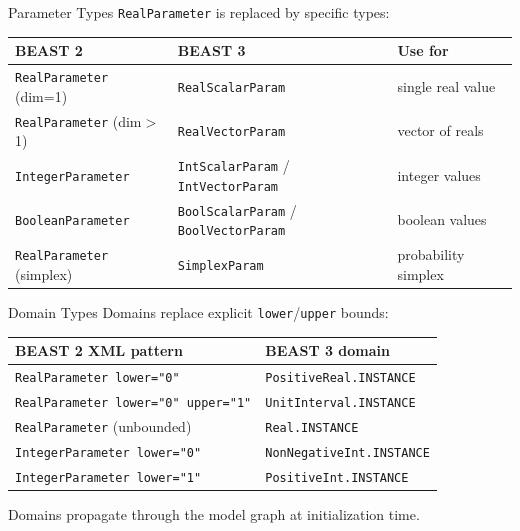 \documentclass[aspectratio=169,11pt]{beamer}
\newcommand{\code}[1]{\texttt{#1}}
\begin{document}
\begin{frame}{Parameter Types}
\code{RealParameter} is replaced by specific types:
\vspace{0.5em}

\begin{center}
\begin{tabular}{lll}
\toprule
\textbf{BEAST 2} & \textbf{BEAST 3} & \textbf{Use for} \\
\midrule
\code{RealParameter} (dim=1) & \code{RealScalarParam} & single real value \\
\code{RealParameter} (dim$>$1) & \code{RealVectorParam} & vector of reals \\
\code{IntegerParameter} & \code{IntScalarParam} / \code{IntVectorParam} & integer values \\
\code{BooleanParameter} & \code{BoolScalarParam} / \code{BoolVectorParam} & boolean values \\
\code{RealParameter} (simplex) & \code{SimplexParam} & probability simplex \\
\bottomrule
\end{tabular}
\end{center}
\end{frame}

\begin{frame}{Domain Types}
Domains replace explicit \code{lower}/\code{upper} bounds:
\vspace{0.5em}

\begin{center}
\begin{tabular}{ll}
\toprule
\textbf{BEAST 2 XML pattern} & \textbf{BEAST 3 domain} \\
\midrule
\code{RealParameter lower="0"} & \code{PositiveReal.INSTANCE} \\
\code{RealParameter lower="0" upper="1"} & \code{UnitInterval.INSTANCE} \\
\code{RealParameter} (unbounded) & \code{Real.INSTANCE} \\
\code{IntegerParameter lower="0"} & \code{NonNegativeInt.INSTANCE} \\
\code{IntegerParameter lower="1"} & \code{PositiveInt.INSTANCE} \\
\bottomrule
\end{tabular}
\end{center}
\vspace{0.5em}
Domains propagate through the model graph at initialization time.
\end{frame}
\end{document}
